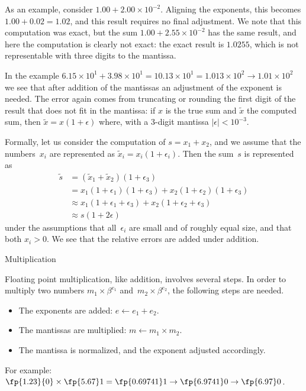As an example, consider $1.00+2.00\times 10^{-2}$. Aligning the
exponents, this becomes $1.00+0.02=1.02$, and this result requires no
final adjustment. We note that this computation was exact, but
the sum $1.00+2.55\times 10^{-2}$ has the same result, and here the
computation is clearly not exact: the exact result is $1.0255$, which
is not representable with three digits to the mantissa.

In the example $6.15\times 10^1+3.98\times 10^1=10.13\times 10^1=1.013\times
10^2\rightarrow 1.01\times 10^2$ we see that after addition of the mantissas an
adjustment of the exponent is needed. The error again comes from
truncating or rounding the first digit of the result that does not fit
in the mantissa: if $x$ is the true sum and $\tilde x$ the computed
sum, then $\tilde x=x(1+\epsilon)$ where, with a 3-digit mantissa
$|\epsilon|<10^{-3}$.

Formally, let us consider the computation of
$s=x_1+x_2$, and we assume that the numbers~$x_i$ are represented
as $\tilde x_i=x_i(1+\epsilon_i)$.
Then the sum~$s$ is represented as
\[ 
\begin{array}{rl}
\tilde s&=(\tilde x_1+\tilde x_2)(1+\epsilon_3)\\
&=x_1(1+\epsilon_1)(1+\epsilon_3)+x_2(1+\epsilon_2)(1+\epsilon_3)\\
&\approx x_1(1+\epsilon_1+\epsilon_3)+x_2(1+\epsilon_2+\epsilon_3)\\
&\approx s(1+2\epsilon)
\end{array}
\]
under the assumptions that all~$\epsilon_i$ are small and of roughly
equal size, and that both $x_i>0$.
We see that the relative errors are added under addition.

 {Multiplication}

Floating point multiplication, like addition, involves several steps.
In order to multiply two numbers $m_1\times\beta^{e_1}$
and~$m_2\times\beta^{e_2}$, the following steps are needed.
\begin{itemize}
\item The exponents are added: $e\leftarrow e_1+e_2$.
\item The mantissas are multiplied: $m\leftarrow
  m_1\times m_2$.
\item The mantissa is normalized, and the exponent adjusted accordingly.
\end{itemize}

For example: $\fp{1.23}{0}\times\fp{5.67}1=\fp{0.69741}1\rightarrow
\fp{6.9741}0\rightarrow\fp{6.97}0$.


